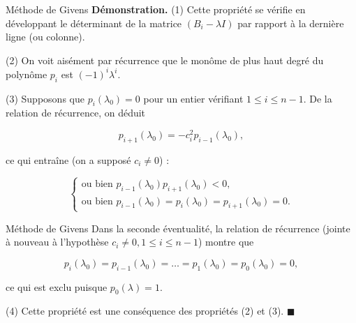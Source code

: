 \documentclass[french, 10pt]{beamer}
\theoremstyle{definition}
\begin{document}
\begin{frame}{Méthode de Givens}
	\textbf{Démonstration.} (1) Cette propriété se vérifie en développant le déterminant de la matrice \( (B_i - \lambda I) \) par rapport à la dernière ligne (ou colonne).
	
	(2) On voit aisément par récurrence que le monôme de plus haut degré du polynôme \( p_i \) est \( (-1)^i \lambda^i \).
	
	(3) Supposons que \( p_i(\lambda_0) = 0 \) pour un entier vérifiant \( 1 \leq i \leq n-1 \). De la relation de récurrence, on déduit
	
	\[
	p_{i+1}(\lambda_0) = -c_i^2 p_{i-1}(\lambda_0),
	\]
	
	ce qui entraîne (on a supposé \( c_i \neq 0 \)) :
	
	\[
	\left\{
	\begin{array}{l}
		\text{ou bien } p_{i-1}(\lambda_0) p_{i+1}(\lambda_0) < 0, \\
		\text{ou bien } p_{i-1}(\lambda_0) = p_i(\lambda_0) = p_{i+1}(\lambda_0) = 0.
	\end{array}
	\right.
	\]
	
	
\end{frame}
\begin{frame}{Méthode de Givens}
	Dans la seconde éventualité, la relation de récurrence (jointe à nouveau à l’hypothèse \( c_i \neq 0, 1 \leq i \leq n-1 \)) montre que
	
	\[
	p_{i}(\lambda_0) = p_{i-1}(\lambda_0) = \dots = p_1(\lambda_0) = p_0(\lambda_0) = 0,
	\]
	
	ce qui est exclu puisque \( p_0(\lambda) = 1 \).
	
	(4) Cette propriété est une conséquence des propriétés (2) et (3). \(\blacksquare\)
\end{frame}
\end{document}
